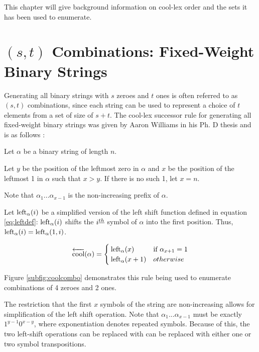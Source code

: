 This chapter will give background information on cool-lex order and the sets it has been used to enumerate.  
\section{$(s,t)$ Combinations: Fixed-Weight Binary Strings} \label{sec:coolCombo}
Generating all binary strings with $s$ zeroes and $t$ ones is often referred to as $(s,t)$ combinations, since each string can be used to represent a choice of $t$ elements from a set of size of $s+t$.  The cool-lex successor rule for generating all fixed-weight binary strings was given by Aaron Williams in his Ph. D thesis and is as follows \cite{williams2009shift}:

 Let $\alpha$ be a binary string of length $n$.

 Let $y$ be the position of the leftmost zero in $\alpha$ and $x$ be the position of the leftmost 1 in $\alpha$ such that $x > y$.  If there is no such 1, let $x=n$.

 Note that $\alpha_1...\alpha_{x-1}$ is the non-increasing prefix of $\alpha$.

 Let $\leftshift[\alpha]{i}$ be a simplified version of the left shift function defined in equation \ref{eq:leftdef}:  $\leftshift[\alpha]{i}$ shifts the $i\thh$ symbol of $\alpha$ into the first position.  Thus, $\leftshift[\alpha]{i}=\lshiftindex[\alpha]{1}{i}$.


\begin{equation*}
    \overleftarrow{\text{cool}}(\alpha) = \begin{cases}
	\leftshift[\alpha]{x} & \text{if $\alpha_{x+1}=1$}\\
	\leftshift[\alpha]{x+1} & otherwise\\
\end{cases}
\end{equation*}

Figure \ref{subfig:coolcombo} demonstrates this rule being used to enumerate combinations of 4 zeroes and 2 ones.


The restriction that the first $x$ symbols of the string are non-increasing allows for simplification of the left shift operation.  Note that $\alpha_1...\alpha_{x-1}$ must be exactly $1^{y-1}0^{x-y}$, where exponentiation denotes repeated symbols.  Because of this, the two left-shift operations can be replaced with can be replaced with either one or two symbol transpositions.

